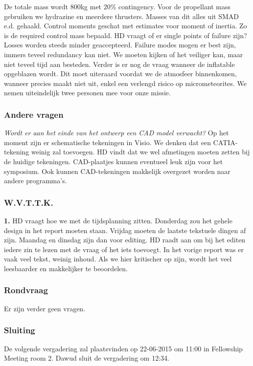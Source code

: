 \newline\newline
De totale mass wordt 800kg met 20\% contingency. Voor de propellant mass gebruiken we hydrazine en meerdere thrusters. Masses van dit alles uit SMAD e.d. gehaald. Control moments geschat met estimates voor moment of inertia. Zo is de required control mass bepaald.
\newline\newline
HD vraagt of er single points of failure zijn? Losses worden steeds minder geaccepteerd. Failure modes mogen er best zijn, immers teveel redundancy kan niet. We moeten kijken of het veiliger kan, maar niet teveel tijd aan besteden. Verder is er nog de vraag wanneer de inflatable opgeblazen wordt. Dit moet uiteraard voordat we de atmosfeer binnenkomen, wanneer precies maakt niet uit, enkel een verlengd risico op micrometeorites. We nemen uiteindelijk twee personen mee voor onze missie.

\subsubsection{Andere vragen}
\textit{Wordt er aan het einde van het ontwerp een CAD model verwacht?}\newline
Op het moment zijn er schematische tekeningen in Visio. We denken dat een CATIA-tekening weinig zal toevoegen. HD vindt dat we wel afmetingen moeten zetten bij de huidige tekeningen. CAD-plaatjes kunnen eventueel leuk zijn voor het symposium. Ook kunnen CAD-tekeningen makkelijk overgezet worden naar andere programma's.

\subsubsection{W.V.T.T.K.}
\textbf{1.} HD vraagt hoe we met de tijdsplanning zitten. Donderdag zou het gehele design in het report moeten staan. Vrijdag moeten de laatste tekstuele dingen af zijn. Maandag en dinsdag zijn dan voor editing. HD raadt aan om bij het editen iedere zin te lezen met de vraag of het iets toevoegt. In het vorige report was er vaak veel tekst, weinig inhoud. Als we hier kritischer op zijn, wordt het veel leesbaarder en makkelijker te beoordelen.

\subsubsection{Rondvraag}
Er zijn verder geen vragen.

\subsubsection{Sluiting}
De volgende vergadering zal plaatsvinden op 22-06-2015 om 11:00 in Fellowship Meeting room 2.
\newline\newline
Dawud sluit de vergadering om 12:34.